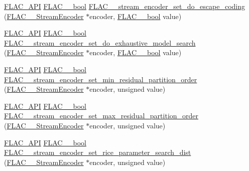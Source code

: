 \begin{DoxyCompactItemize}
\item 
\hyperlink{group__flac__export_ga56ca07df8a23310707732b1c0007d6f5}{F\+L\+A\+C\+\_\+\+A\+PI} \hyperlink{ordinals_8h_a95103469f1cbd78b8cf250194985b34e}{F\+L\+A\+C\+\_\+\+\_\+bool} \hyperlink{group__flac__stream__encoder_gaa839d19b6d1b30ba0407d419bdb6fe67}{F\+L\+A\+C\+\_\+\+\_\+stream\+\_\+encoder\+\_\+set\+\_\+do\+\_\+escape\+\_\+coding} (\hyperlink{struct_f_l_a_c_____stream_encoder}{F\+L\+A\+C\+\_\+\+\_\+\+Stream\+Encoder} $\ast$encoder, \hyperlink{ordinals_8h_a95103469f1cbd78b8cf250194985b34e}{F\+L\+A\+C\+\_\+\+\_\+bool} value)
\item 
\hyperlink{group__flac__export_ga56ca07df8a23310707732b1c0007d6f5}{F\+L\+A\+C\+\_\+\+A\+PI} \hyperlink{ordinals_8h_a95103469f1cbd78b8cf250194985b34e}{F\+L\+A\+C\+\_\+\+\_\+bool} \hyperlink{group__flac__stream__encoder_ga7fbc05ec9abd249a400fccb9f189e55e}{F\+L\+A\+C\+\_\+\+\_\+stream\+\_\+encoder\+\_\+set\+\_\+do\+\_\+exhaustive\+\_\+model\+\_\+search} (\hyperlink{struct_f_l_a_c_____stream_encoder}{F\+L\+A\+C\+\_\+\+\_\+\+Stream\+Encoder} $\ast$encoder, \hyperlink{ordinals_8h_a95103469f1cbd78b8cf250194985b34e}{F\+L\+A\+C\+\_\+\+\_\+bool} value)
\item 
\hyperlink{group__flac__export_ga56ca07df8a23310707732b1c0007d6f5}{F\+L\+A\+C\+\_\+\+A\+PI} \hyperlink{ordinals_8h_a95103469f1cbd78b8cf250194985b34e}{F\+L\+A\+C\+\_\+\+\_\+bool} \hyperlink{group__flac__stream__encoder_gae3e2dd204f276d051bf1a118383bfda2}{F\+L\+A\+C\+\_\+\+\_\+stream\+\_\+encoder\+\_\+set\+\_\+min\+\_\+residual\+\_\+partition\+\_\+order} (\hyperlink{struct_f_l_a_c_____stream_encoder}{F\+L\+A\+C\+\_\+\+\_\+\+Stream\+Encoder} $\ast$encoder, unsigned value)
\item 
\hyperlink{group__flac__export_ga56ca07df8a23310707732b1c0007d6f5}{F\+L\+A\+C\+\_\+\+A\+PI} \hyperlink{ordinals_8h_a95103469f1cbd78b8cf250194985b34e}{F\+L\+A\+C\+\_\+\+\_\+bool} \hyperlink{group__flac__stream__encoder_ga6de153da5a8eeeb1be2271c27fa58b37}{F\+L\+A\+C\+\_\+\+\_\+stream\+\_\+encoder\+\_\+set\+\_\+max\+\_\+residual\+\_\+partition\+\_\+order} (\hyperlink{struct_f_l_a_c_____stream_encoder}{F\+L\+A\+C\+\_\+\+\_\+\+Stream\+Encoder} $\ast$encoder, unsigned value)
\item 
\hyperlink{group__flac__export_ga56ca07df8a23310707732b1c0007d6f5}{F\+L\+A\+C\+\_\+\+A\+PI} \hyperlink{ordinals_8h_a95103469f1cbd78b8cf250194985b34e}{F\+L\+A\+C\+\_\+\+\_\+bool} \hyperlink{group__flac__stream__encoder_ga668de93e7061bce21475c062ffab3e18}{F\+L\+A\+C\+\_\+\+\_\+stream\+\_\+encoder\+\_\+set\+\_\+rice\+\_\+parameter\+\_\+search\+\_\+dist} (\hyperlink{struct_f_l_a_c_____stream_encoder}{F\+L\+A\+C\+\_\+\+\_\+\+Stream\+Encoder} $\ast$encoder, unsigned value)

\end{DoxyCompactItemize}
